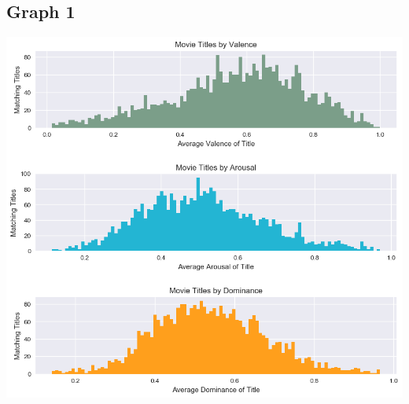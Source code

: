 \documentclass[10pt,a4paper]{article}
\begin{document}
    \begin{appendices}
        \section{Graph 1}
        \includegraphics[scale=0.8]{Movie_titles_by_vad}

\end{appendices}
\end{document}
